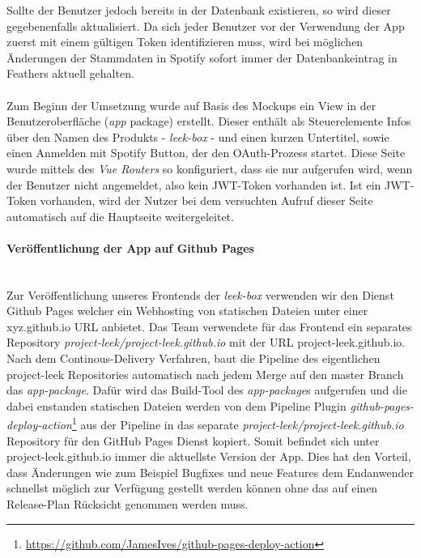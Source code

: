 \documentclass[10pt, a4paper]{article}
\begin{document}
\begin{onehalfspace}
Sollte der Benutzer jedoch bereits in der Datenbank existieren, so wird dieser gegebenenfalls aktualisiert. Da sich jeder Benutzer vor der Verwendung der App
zuerst  mit einem gültigen Token identifizieren muss, wird bei möglichen Änderungen der Stammdaten in Spotify sofort immer der Datenbankeintrag in Feathers
aktuell gehalten.
\\~\\
Zum Beginn der Umsetzung wurde auf Basis des Mockups ein View in der Benutzeroberfläche (\textit{app} package) erstellt. Dieser enthält als Steuerelemente Infos
über den Namen des Produkts - \textit{leek-box} - und einen kurzen Untertitel, sowie einen \glqq Anmelden mit Spotify\grqq{} Button, der den OAuth-Prozess startet.
Diese Seite wurde mittels des \textit{Vue Routers} so konfiguriert, dass sie nur aufgerufen wird, wenn der Benutzer nicht angemeldet, also kein JWT-Token
vorhanden ist. Ist ein JWT-Token vorhanden, wird der Nutzer bei dem versuchten Aufruf dieser Seite automatisch auf die Hauptseite weitergeleitet.

\paragraph*{Veröffentlichung der App auf Github Pages} $~$ \\
Zur Veröffentlichung unseres Frontends der \textit{leek-box} verwenden wir den Dienst Github Pages welcher ein Webhosting von statischen Dateien unter einer xyz.github.io URL anbietet.
Das Team verwendete für das Frontend ein separates Repository \textit{project-leek/project-leek.github.io} mit der URL project-leek.github.io.
Nach dem Continous-Delivery Verfahren, baut die Pipeline des eigentlichen project-leek Repositories automatisch nach jedem Merge auf den master Branch das \textit{app-package}.
Dafür wird das Build-Tool des \textit{app-package}s aufgerufen und die dabei enstanden statischen Dateien werden von dem Pipeline Plugin
\textit{github-pages-deploy-action}\footnote{\raggedright\url{https://github.com/JamesIves/github-pages-deploy-action}} aus der Pipeline in das separate
\textit{project-leek/project-leek.github.io} Repository für den GitHub Pages Dienst kopiert. Somit befindet sich unter project-leek.github.io immer die aktuellste Version der App.
Dies hat den Vorteil, dass Änderungen wie zum Beispiel Bugfixes und neue Features dem Endanwender schnellst möglich zur Verfügung gestellt werden können ohne das auf einen Release-Plan Rücksicht genommen werden muss.


\end{onehalfspace}
\end{document}
